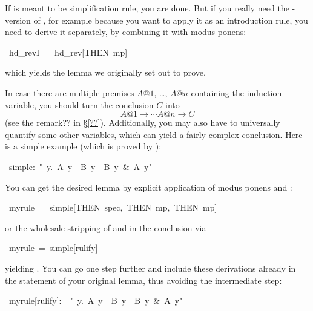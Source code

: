 \begin{isabelle}
\begin{isamarkuptext}
If  is meant to be simplification rule, you are done. But if you
really need the \isa{\isasymLongrightarrow}-version of , for
example because you want to apply it as an introduction rule, you need to
derive it separately, by combining it with modus ponens:%
\end{isamarkuptext}%
\ hd\_revI\ =\ hd\_rev[THEN\ mp]%
\begin{isamarkuptext}%
\noindent
which yields the lemma we originally set out to prove.

In case there are multiple premises $A@1$, \dots, $A@n$ containing the
induction variable, you should turn the conclusion $C$ into
\[ A@1 \longrightarrow \cdots A@n \longrightarrow C \]
(see the remark?? in \S\ref{??}).
Additionally, you may also have to universally quantify some other variables,
which can yield a fairly complex conclusion.
Here is a simple example (which is proved by ):%
\end{isamarkuptext}%
\ simple:\ {"}{\isasymforall}\ y.\ A\ y\ {\isasymlongrightarrow}\ B\ y\ {\isasymlongrightarrow}\ B\ y\ \&\ A\ y{"}%
\begin{isamarkuptext}%
\noindent
You can get the desired lemma by explicit
application of modus ponens and :%
\end{isamarkuptext}%
\ myrule\ =\ simple[THEN\ spec,\ THEN\ mp,\ THEN\ mp]%
\begin{isamarkuptext}%
\noindent
or the wholesale stripping of \isa{\isasymforall} and
\isa{\isasymlongrightarrow} in the conclusion via %
\end{isamarkuptext}%
\ myrule\ =\ simple[rulify]%
\begin{isamarkuptext}%
\noindent
yielding .
You can go one step further and include these derivations already in the
statement of your original lemma, thus avoiding the intermediate step:%
\end{isamarkuptext}%
\ myrule[rulify]:\ \ {"}{\isasymforall}\ y.\ A\ y\ {\isasymlongrightarrow}\ B\ y\ {\isasymlongrightarrow}\ B\ y\ \&\ A\ y{"}%
\begin{isamarkuptext}%
\bigskip


\end{isamarkuptext}
\end{isabelle}
